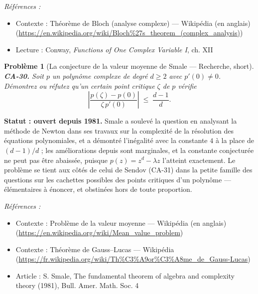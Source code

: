 \documentclass[11pt]{article}
\newtheorem{problem}{Problème}
\newenvironment{refs}{\par\small\noindent\emph{Références :}\begin{itemize}\setlength\itemsep{0pt}}{\end{itemize}\normalsize}
\begin{document}
\begin{refs}
\item Contexte : Théorème de Bloch (analyse complexe) --- Wikipédia (en anglais) (\url{https://en.wikipedia.org/wiki/Bloch%27s_theorem_(complex_analysis)})
\item Lecture : Conway, \textit{Functions of One Complex Variable I}, ch. XII
\end{refs}

\bigskip

\begin{problem}[{La conjecture de la valeur moyenne de Smale --- Recherche, short}]
\textbf{CA-30.} Soit $ p $ un polynôme complexe de degré $ d \ge 2 $
avec $ p'(0) \ne 0 $. Démontrez ou réfutez qu'un certain point critique $ \zeta $ de $ p $
vérifie
\[ \left| \frac{p(\zeta) - p(0)}{\zeta \, p'(0)} \right| \;\le\; \frac{d - 1}{d}. \]
\end{problem}

\noindent \textbf{Statut : ouvert depuis 1981.} Smale a soulevé la question en analysant la
méthode de Newton dans ses travaux sur la complexité de la résolution des équations polynomiales, et
a démontré l'inégalité avec la constante $ 4 $ à la place de $ (d-1)/d $ ; les améliorations
depuis sont marginales, et la constante conjecturée ne peut pas être abaissée, puisque
$ p(z) = z^d - \lambda z $ l'atteint exactement. Le problème se tient aux côtés de celui de Sendov
(CA-31) dans la petite famille des questions sur les cachettes possibles des points critiques d'un
polynôme --- élémentaires à énoncer, et obstinées hors de toute proportion.

\begin{refs}
\item Contexte : Problème de la valeur moyenne --- Wikipédia (en anglais) (\url{https://en.wikipedia.org/wiki/Mean_value_problem})
\item Contexte : Théorème de Gauss--Lucas --- Wikipédia (\url{https://fr.wikipedia.org/wiki/Th%C3%A9or%C3%A8me_de_Gauss-Lucas})
\item Article : S. Smale, \og{} The fundamental theorem of algebra and complexity theory \fg{} (1981), Bull. Amer. Math. Soc. 4
\end{refs}

\bigskip
\end{document}
